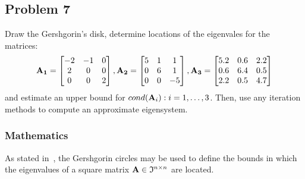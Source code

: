\subsection{Problem 7}%
\label{sec:problem_7}

Draw the Gershgorin's disk, determine locations of the eigenvales for the matrices:
\begin{equation*}
    \mathbf{A_1} = 
    \begin{bmatrix}
        -2 & -1 &  0\\
         2 &  0 &  0\\
         0 &  0 &  2 
    \end{bmatrix},
    \mathbf{A_2} = 
    \begin{bmatrix}
        5 & 1 &  1\\
        0 & 6 &  1\\
        0 & 0 &  -5 
    \end{bmatrix},
    \mathbf{A_3} = 
    \begin{bmatrix}
        5.2 &  0.6 &  2.2\\
        0.6 &  6.4 &  0.5\\
        2.2 &  0.5 &  4.7 
    \end{bmatrix}
\end{equation*}
and estimate an upper bound for $cond(\mathbf{A}_i) : i = 1, \ldots, 3$.
Then, use any iteration methods to compute an approximate eigensystem.

\subsubsection*{Mathematics}
As stated in~\cite{Zdunek}, the Gershgorin circles may be used to define the bounds in
which the eigenvalues of a square matrix $\mathbf{A}\in\mathfrak{I}^{n\times{}n}$ are
located.

